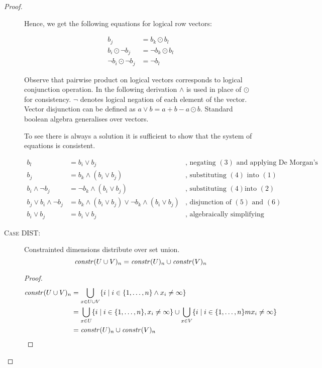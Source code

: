 \begin{proof}
\begin{description}
    Hence, we get the following equations for logical row vectors:

    \begin{align}
      b_j & = b_k \odot b_l \\
      b_i \odot \neg b_j & = \neg b_k \odot b_l \\
      \neg b_i \odot \neg b_j & = \neg b_l
    \end{align}

    Observe that pairwise product on logical vectors corresponds to logical
    conjunction operation. In the following derivation $\wedge$ is used in place
    of $\odot$ for consistency. $\neg$ denotes logical negation of each element
    of the vector. Vector disjunction can be defined as $a \vee b = a + b - a
    \odot b$. Standard boolean algebra generalises over vectors.

    To see there is always a solution it is sufficient to show that the system
    of equations is consistent.

    \begin{align}
      b_l &= b_i \vee b_j & \mbox{, negating $(3)$ and applying De Morgan's law} \\
      b_j &= b_k \wedge (b_i \vee b_j) & \mbox{, substituting $(4)$ into $(1)$} \\
      b_i \wedge \neg b_j &= \neg b_k \wedge (b_i \vee b_j) & \mbox{, substituting $(4)$
        into $(2)$} \\
      b_j \vee b_i \wedge \neg b_j &= b_k \wedge (b_i \vee b_j) \vee \neg b_k \wedge (b_i \vee b_j) & \mbox{, disjunction of $(5)$ and $(6)$} \\
      b_i \vee b_j &= b_i \vee b_j & \mbox{, algebraically simplifying (7)} \nonumber
    \end{align}



  \item[\textsc{Case DIST}:]
    \begin{lemma}\label{lem:effdims}
      Constrainted dimensions distribute over set union.
      $$\mathit{constr}(U \cup V)_{n} = \mathit{constr}(U)_{n} \cup \mathit{constr}(V)_{n}$$
    \end{lemma}

    \begin{proof}
      \begin{align*}
        \mathit{constr}(U \cup V)_{n} &= \bigcup_{x \in U \cup V} \{ i \; | \; i \in \{1, \ldots, n\} \wedge x_i \neq \infty \} \\
        &= \bigcup_{x \in U} \{ i \; | \; i \in \{1, \ldots, n\}, x_i \neq \infty \} \cup
           \bigcup_{x \in V} \{ i \; | \; i \in \{1, \ldots, n\}m x_i \neq \infty \} \\
        &= \mathit{constr}(U)_{n} \cup \mathit{constr}(V)_{n} \\
      \end{align*}
    \end{proof}


\end{description}
\end{proof}
